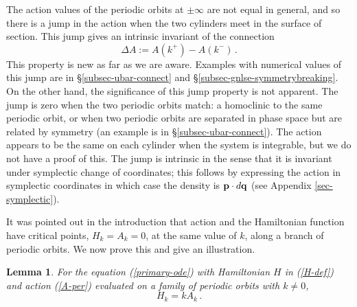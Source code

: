 \documentclass[10pt]{article}
\newtheorem{lem}[thm]{Lemma}
\begin{document}
The action values of the periodic orbits at $\pm\infty$ are not equal in
general, and so there is a jump in the action when the two cylinders meet in the
surface of section.  This jump gives an intrinsic invariant of the connection
%
\begin{equation}\label{delta-A-def}
\Delta A := A(k^+)-A(k^-)\,.
\end{equation}
%
This property is new as far as we are aware.  Examples with numerical values of this jump are in \S\ref{subsec-ubar-connect} and \S\ref{subsec-gnlse-symmetrybreaking}. On the other hand, the
significance of this jump property is not apparent. The jump is zero when the
two periodic orbits match: a homoclinic to the same periodic orbit, or when two
periodic orbits are separated in phase space but are related by symmetry (an
example is in \S\ref{subsec-ubar-connect}). The action appears to be the same on each cylinder when the system is integrable, but we do not have a proof of this. The jump is intrinsic in the sense that
it is invariant under symplectic change of coordinates; this follows by expressing the action in symplectic coordinates in which case the density is ${\bf p}\cdot d{\bf q}$ (see Appendix \ref{sec-symplectic}).

It was pointed out in the introduction that action and the Hamiltonian function have critical points,
$H_k=A_k=0$, at the same value of $k$, along a branch of periodic orbits. We now prove this and give an illustration.

\begin{lem}\label{lemma-Hk} For the equation (\ref{primary-ode}) with Hamiltonian $H$ in (\ref{H-def}) and action (\ref{A-per}) evaluated on a family of periodic orbits with $k\neq0$,
    \begin{equation}\label{HkAk}
H_k = k A_k\,.
\end{equation}
 \end{lem}
 
\end{document}
